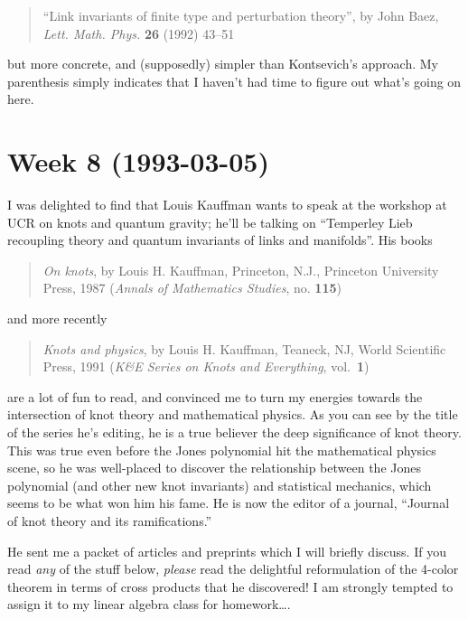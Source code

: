 \documentclass{article}
\begin{document}
\begin{quote}
``Link invariants of finite type and perturbation theory'', by John
Baez, \emph{Lett. Math. Phys.} \textbf{26} (1992) 43--51
\end{quote}

but more concrete, and (supposedly) simpler than Kontsevich's approach.
My parenthesis simply indicates that I haven't had time to figure out
what's going on here.
\hypertarget{week-8-1993-03-05}{%
\section{Week 8 (1993-03-05)}\label{week-8-1993-03-05}}

I was delighted to find that Louis Kauffman wants to speak at the
workshop at UCR on knots and quantum gravity; he'll be talking on
``Temperley Lieb recoupling theory and quantum invariants of links and
manifolds''. His books

\begin{quote}
\emph{On knots}, by Louis H. Kauffman, Princeton, N.J., Princeton
University Press, 1987 (\emph{Annals of Mathematics Studies}, no.
\textbf{115})
\end{quote}

and more recently

\begin{quote}
\emph{Knots and physics}, by Louis H. Kauffman, Teaneck, NJ, World
Scientific Press, 1991 (\emph{K\&E Series on Knots and Everything},
vol.~\textbf{1})
\end{quote}

are a lot of fun to read, and convinced me to turn my energies towards
the intersection of knot theory and mathematical physics. As you can see
by the title of the series he's editing, he is a true believer the deep
significance of knot theory. This was true even before the Jones
polynomial hit the mathematical physics scene, so he was well-placed to
discover the relationship between the Jones polynomial (and other new
knot invariants) and statistical mechanics, which seems to be what won
him his fame. He is now the editor of a journal, ``Journal of knot
theory and its ramifications.''

He sent me a packet of articles and preprints which I will briefly
discuss. If you read \emph{any} of the stuff below, \emph{please} read
the delightful reformulation of the 4-color theorem in terms of cross
products that he discovered! I am strongly tempted to assign it to my
linear algebra class for homework\ldots.
\end{document}
